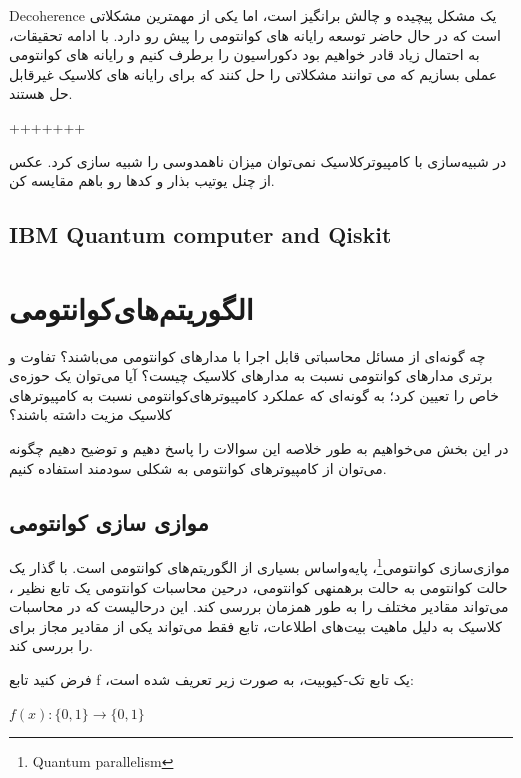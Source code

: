 \documentclass{book}
\begin{document}
Decoherence یک مشکل پیچیده و چالش برانگیز است، اما یکی از مهمترین مشکلاتی است که در حال حاضر توسعه رایانه های کوانتومی را پیش رو دارد. با ادامه تحقیقات، به احتمال زیاد قادر خواهیم بود دکوراسیون را برطرف کنیم و رایانه های کوانتومی عملی بسازیم که می توانند مشکلاتی را حل کنند که برای رایانه های کلاسیک غیرقابل حل هستند.

+++++++

در شبیه‌سازی با کامپیوترکلاسیک نمی‌توان میزان ناهمدوسی را شبیه سازی کرد. 
عکس از چنل یوتیب بذار و کدها رو باهم مقایسه کن.

\newpage


\section{IBM Quantum computer and Qiskit}




\newpage



\chapter{الگوریتم‌های‌کوانتومی‌}


چه گونه‌ای از مسائل محاسباتی قابل اجرا با مدارهای کوانتومی می‌باشند؟ 
تفاوت و برتری مدار‌های کوانتومی نسبت به مدار‌های کلاسیک چیست؟
آیا می‌توان یک حوزه‌ی خاص را تعیین کرد؛ به گونه‌ای که عملکرد کامپیوترهای‌‌کوانتومی نسبت به کامپیوتر‌های کلاسیک مزیت داشته باشند؟

در این بخش می‌خواهیم به طور خلاصه این سوالات را پاسخ دهیم و توضیح دهیم چگونه می‌توان از کامپیوتر‌های کوانتومی به شکلی سودمند استفاده کنیم.

\section{موازی سازی کوانتومی}

موازی‌سازی کوانتومی\footnote{Quantum parallelism}، پایه‌واساس بسیاری از الگوریتم‌های کوانتومی است. با گذار یک حالت کوانتومی به حالت برهمنهی کوانتومی، درحین محاسبات کوانتومی یک تابع نظیر ، می‌تواند مقادیر مختلف  را به طور همزمان بررسی کند. این درحالیست که در محاسبات کلاسیک به دلیل ماهیت بیت‌های اطلاعات، تابع  فقط می‌تواند یکی از مقادیر مجاز برای  را بررسی کند.


فرض کنید تابع f ،یک تابع تک-کیوبیت، به صورت زیر تعریف شده است:\\
\begin{center}
	$f (x) : \{0, 1\} \rightarrow \{0, 1\}$\\
\end{center}
\end{document}
